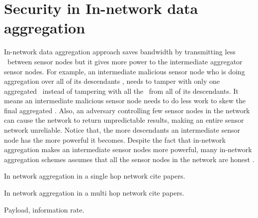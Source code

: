 \section{Security in In-network data aggregation}
	In-network data aggregation approach saves bandwidth by transmitting less \payloads\  between sensor nodes but it gives more power to the intermediate aggregator sensor nodes. 
	For example, an intermediate malicious sensor node who is doing aggregation over all of its descendants \payloads, needs to tamper with only one aggregated \payload\ instead of tampering with all the \payloads\ from all of its descendants. 
	It means an intermediate malicious sensor node needs to do less work to skew the final aggregated \payload.
	Also, an adversary controlling few sensor nodes in the network can cause the network to return unpredictable results, making an entire sensor network unreliable.
	Notice that, the more descendants an intermediate sensor node has the more powerful it becomes.
	Despite the fact that in-network aggregation makes an intermediate sensor nodes more powerful, many in-network aggregation schemes assumes that all the sensor nodes in the network are honest \cite{yao2002cougar, madden2003design}.

In network aggregation in a single hop network cite papers.

In network aggregation in a  multi hop network cite papers.

Payload, information rate.

